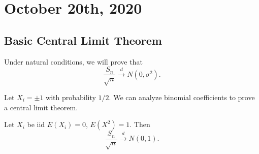 \documentclass[11pt]{scrartcl}
\begin{document}
\pagebreak
\section{October 20th, 2020}
\subsection{Basic Central Limit Theorem}
Under natural conditions, we will prove that 
$$\frac{S_n}{\sqrt{n}} \xrightarrow{d} N(0, \sigma^2).$$
\begin{example} Let $X_i = \pm 1$ with probability $1/2$.  We can analyze binomial coefficients to prove a central limit theorem.
\end{example}
\begin{thm} Let $X_i$ be iid $E(X_i) = 0$, $E(X^2) = 1$.  Then
$$\frac{S_n}{\sqrt{n}} \xrightarrow{d} N(0, 1).$$
\end{thm}
\end{document}
